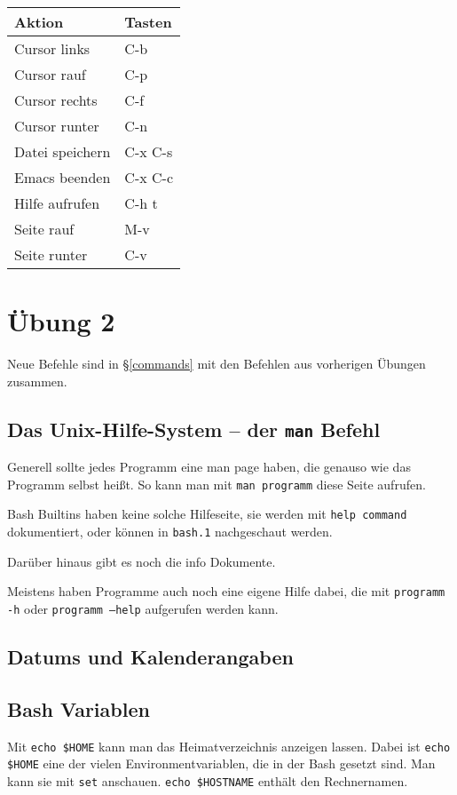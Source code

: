 \documentclass[12pt]{article}
\begin{document}
\begin{tabular}{ll}
Aktion & Tasten \\
\hline
Cursor links & C-b \\
Cursor rauf & C-p \\
Cursor rechts & C-f \\
Cursor runter & C-n \\
Datei speichern & C-x C-s \\
Emacs beenden & C-x C-c \\
Hilfe aufrufen & C-h t \\
Seite rauf & M-v \\
Seite runter & C-v \\
\end{tabular}

\section{Übung 2}

Neue Befehle sind in §\ref{commands} mit den Befehlen aus vorherigen Übungen zusammen.

\subsection{Das Unix-Hilfe-System -- der \texttt{man} Befehl}

Generell sollte jedes Programm eine man page haben, die genauso wie das Programm selbst heißt. So kann man mit \texttt{man programm} diese Seite aufrufen.

Bash Builtins haben keine solche Hilfeseite, sie werden mit \texttt{help command} dokumentiert, oder können in \texttt{bash.1} nachgeschaut werden.

Darüber hinaus gibt es noch die info Dokumente.

Meistens haben Programme auch noch eine eigene Hilfe dabei, die mit \texttt{programm -h} oder \texttt{programm --help} aufgerufen werden kann.

\subsection{Datums und Kalenderangaben}

\subsection{Bash Variablen}

Mit \texttt{echo \${HOME}} kann man das Heimatverzeichnis anzeigen lassen. Dabei ist \texttt{echo \$HOME} eine der vielen Environmentvariablen, die in der Bash gesetzt sind. Man kann sie mit \texttt{set} anschauen. \texttt{echo \${HOSTNAME}} enthält den Rechnernamen.
\end{document}
